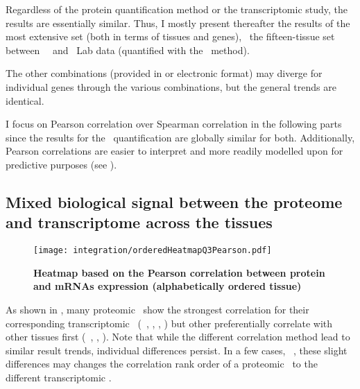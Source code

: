 Regardless of the protein quantification method or
the transcriptomic study, %
the results are essentially similar.
Thus, I mostly present thereafter the results of the most extensive set
(both in terms of tissues and genes),
\ie\ the fifteen-tissue set between \uhlen\ \etal\ and \pandey\ Lab data
(quantified with the \PPKM\ method).\mybr\

\vspace{-1mm}
The other combinations
(provided in  or electronic format)
may diverge for individual genes through the various combinations,
but the general trends are identical.
\vspace{-1mm}

I focus on Pearson correlation over Spearman correlation
in the following parts
since the results for the \PPKM\ quantification are globally similar for both.
Additionally, Pearson correlations are easier to interpret
and more readily modelled upon for predictive purposes
(see ).\mybr\
\vspace{-1.5mm}

\subsection{Mixed biological signal between the proteome and transcriptome
across the tissues}
\vspace{-8mm}
\begin{figure}[!hb]
    \texttt{[image: integration/orderedHeatmapQ3Pearson.pdf]}\centering
    \vspace{-3.5mm}
    \caption[Heatmap based on the Pearson correlation between protein and mRNAs
    expression (alphabetically ordered tissue)]{\label{fig:orderedHeatmapPearson}%
    \textbf{Heatmap based on the Pearson correlation between protein and mRNAs
    expression (alphabetically ordered tissue)}}
\end{figure}

As shown in ,
many proteomic \treps\ show the strongest correlation for
their corresponding transcriptomic \trep\
(\eg\ \liver, \testis, \ovary, \pancreas)
but other preferentially correlate with other tissues first
(\eg\ \tissue{Urinarybladder}, \Oesophagus, \gallbladder).
Note that while the different correlation method lead to similar result trends,
individual differences persist.
In a few cases, \eg\ \heart,
these slight differences may changes the correlation rank order of
a proteomic \treps\ to the different transcriptomic \treps{}.

